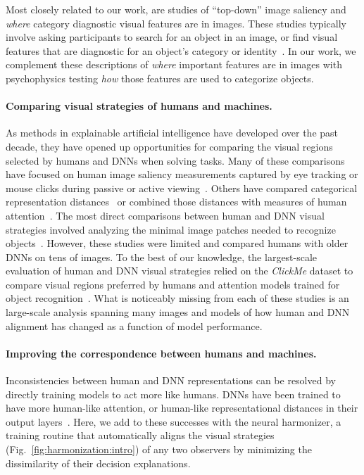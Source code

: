 Most closely related to our work, are studies of ``top-down'' image saliency and \textit{where} category diagnostic visual features are in images. These studies typically involve asking participants to search for an object in an image, or find visual features that are diagnostic for an object's category or identity~\cite{Linsley2017-qe, Linsley2019-ew, Koehler2014-li, Buswell1935-uu, Yarbus_undated-cq, Posner1980-hh, Mannan2009-xq}. In our work, we complement these descriptions of \textit{where} important features are in images with psychophysics testing \textit{how} those features are used to categorize objects.

\paragraph{Comparing visual strategies of humans and machines.} As methods in explainable artificial intelligence have developed over the past decade, they have opened up opportunities for comparing the visual regions selected by humans and DNNs when solving tasks. Many of these comparisons have focused on human image saliency measurements captured by eye tracking or mouse clicks during passive or active viewing~\cite{Linsley2017-qe,Linsley2019-ew,Jiang2015-vl,Peterson2018-pu,Lai2019-ln,Ebrahimpour2019-dc}. Others have compared categorical representation distances~\cite{Peterson2018-pu,Roads2020-gd} or combined those distances with measures of human attention~\cite{Langlois2021-ns}. The most direct comparisons between human and DNN visual strategies involved analyzing the minimal image patches needed to recognize objects~\cite{Ullman2016-wy,Funke2018-ft,Srivastava2019-jg}. However, these studies were limited and compared humans with older DNNs on tens of images. To the best of our knowledge, the largest-scale evaluation of human and DNN visual strategies relied on the \textit{ClickMe} dataset to compare visual regions preferred by humans and attention models trained for object recognition~\cite{Linsley2019-ew}. What is noticeably missing from each of these studies is an large-scale analysis spanning many images and models of how human and DNN alignment has changed as a function of model performance.

\paragraph{Improving the correspondence between humans and machines.} Inconsistencies between human and DNN representations can be resolved by directly training models to act more like humans. DNNs have been trained to have more human-like attention, or human-like representational distances in their output layers~\cite{Peterson2018-pu,Roads2020-gd,Linsley2019-ew,Boyd2021-mh,Bomatter2021-zs}. Here, we add to these successes with the neural harmonizer, a training routine that automatically aligns the visual strategies (Fig.~\ref{fig:harmonization:intro}) of any two observers by minimizing the dissimilarity of their decision explanations.

